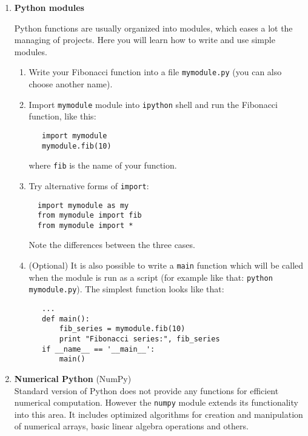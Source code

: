 \documentclass[12pt, a4]{article}
\begin{document}
\begin{enumerate}

\item \textbf{Python modules}

Python functions are usually organized into modules, which eases a lot
the managing of projects. Here you will learn how to write and use
simple modules. 

\begin{enumerate}
 \item Write your Fibonacci function into a file \texttt{mymodule.py} (you can also choose another name).
 \item Import \texttt{mymodule} module into \texttt{ipython}     shell and run the  Fibonacci function, like this:
  \begin{verbatim}
   import mymodule
   mymodule.fib(10)
  \end{verbatim} 
 where \texttt{fib} is the name of your function.
 \item Try alternative forms of \texttt{import}:
 \begin{verbatim}
  import mymodule as my
  from mymodule import fib
  from mymodule import *
 \end{verbatim} 
  Note the differences between the three cases.
 \item (Optional) It is also possible to write a \texttt{main} function which will be called when the module is run as a script (for example like that: \texttt{python mymodule.py}). The simplest function looks like that:
\begin{verbatim}
   ...
   def main():
       fib_series = mymodule.fib(10)
       print "Fibonacci series:", fib_series
   if __name__ == '__main__':
       main()
  \end{verbatim} 
\end{enumerate}

\item \textbf{Numerical Python} (NumPy) \\
Standard version of Python does not provide any functions for
efficient numerical computation. However the \texttt{numpy} module
extends its functionality into this area. It includes optimized
algorithms for creation and manipulation of numerical arrays, basic
linear algebra operations and others.


\end{enumerate}
\end{document}

